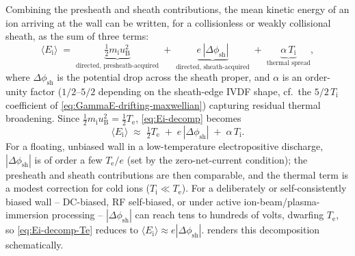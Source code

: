 Combining the presheath and sheath contributions, the mean kinetic energy of an ion arriving at the wall can be written, for a collisionless or weakly collisional sheath, as the sum of three terms:
\begin{equation}
\langle E_{\mathrm{i}} \rangle \;=\; \underbrace{\tfrac{1}{2} m_{\mathrm{i}} u_{\mathrm{B}}^2}_{\text{directed, presheath-acquired}} \;+\; \underbrace{e\,|\Delta\phi_{\mathrm{sh}}|}_{\text{directed, sheath-acquired}} \;+\; \underbrace{\alpha\, T_{\mathrm{i}}}_{\text{thermal spread}},
\label{eq:Ei-decomp}
\end{equation}
where $\Delta\phi_{\mathrm{sh}}$ is the potential drop across the sheath proper, and $\alpha$ is an order-unity factor ($1/2$--$5/2$ depending on the sheath-edge IVDF shape, cf.\ the $5/2\,T_{\mathrm{i}}$ coefficient of \cref{eq:GammaE-drifting-maxwellian}) capturing residual thermal broadening. Since $\tfrac12 m_{\mathrm{i}} u_{\mathrm{B}}^2 = \tfrac12 T_{\mathrm{e}}$, \cref{eq:Ei-decomp} becomes
\begin{equation}
\langle E_{\mathrm{i}} \rangle \;\approx\; \tfrac{1}{2} T_{\mathrm{e}} \;+\; e\,|\Delta\phi_{\mathrm{sh}}| \;+\; \alpha\, T_{\mathrm{i}}.
\label{eq:Ei-decomp-Te}
\end{equation}
For a floating, unbiased wall in a low-temperature electropositive discharge, $|\Delta\phi_{\mathrm{sh}}|$ is of order a few $T_{\mathrm{e}}/e$ (set by the zero-net-current condition); the presheath and sheath contributions are then comparable, and the thermal term is a modest correction for cold ions ($T_{\mathrm{i}} \ll T_{\mathrm{e}}$). For a deliberately or self-consistently biased wall -- DC-biased, RF self-biased, or under active ion-beam/plasma-immersion processing -- $|\Delta\phi_{\mathrm{sh}}|$ can reach tens to hundreds of volts, dwarfing $T_{\mathrm{e}}$, so \cref{eq:Ei-decomp-Te} reduces to $\langle E_{\mathrm{i}}\rangle \approx e|\Delta\phi_{\mathrm{sh}}|$.  renders this decomposition schematically.

